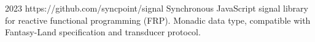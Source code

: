 \cventry
{2023}
{https://github.com/syncpoint/signal}
{}
{}
{}
{
  Synchronous JavaScript signal library for reactive functional programming (FRP).
  Monadic data type, compatible with Fantasy-Land specification and transducer protocol.
}
